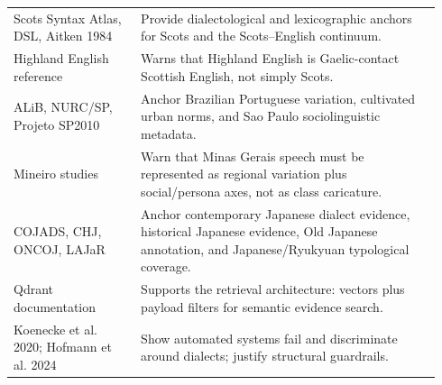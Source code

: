 \documentclass[11pt]{article}
\begin{document}
\begin{longtable}{>{\raggedright\arraybackslash}p{0.28\linewidth}
                  >{\raggedright\arraybackslash}p{0.66\linewidth}}
Scots Syntax Atlas, DSL, Aitken 1984 & Provide dialectological and
lexicographic anchors for Scots and the Scots--English continuum. \\
Highland English reference & Warns that Highland English is Gaelic-contact
Scottish English, not simply Scots. \\
ALiB, NURC/SP, Projeto SP2010 & Anchor Brazilian Portuguese variation,
cultivated urban norms, and Sao Paulo sociolinguistic metadata. \\
Mineiro studies & Warn that Minas Gerais speech must be represented as
regional variation plus social/persona axes, not as class caricature. \\
COJADS, CHJ, ONCOJ, LAJaR & Anchor contemporary Japanese dialect evidence,
historical Japanese evidence, Old Japanese annotation, and Japanese/Ryukyuan
typological coverage. \\
Qdrant documentation & Supports the retrieval architecture: vectors plus
payload filters for semantic evidence search. \\
Koenecke et al. 2020; Hofmann et al. 2024 & Show automated systems fail and
discriminate around dialects; justify structural guardrails. \\
\end{longtable}
\end{document}
